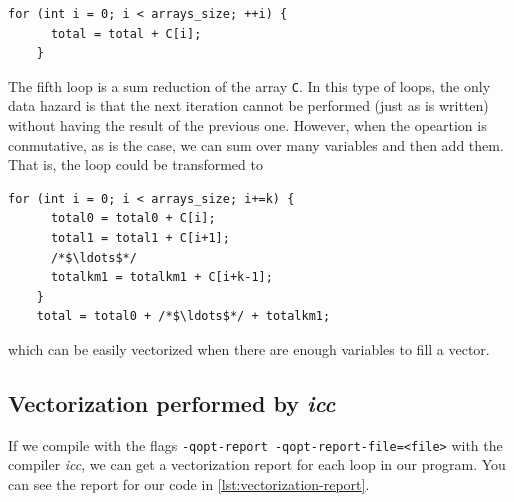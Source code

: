 \documentclass[
    12pt, %
]{fphw}
\newcommand{\tech}{\texttt}
\newcommand{\icc}{\textit{icc}}
\begin{document}
\begin{lstlisting}[gobble=4]
    for (int i = 0; i < arrays_size; ++i) {
      total = total + C[i];
    }

\end{lstlisting}

    The fifth loop is a sum reduction of the array \tech{C}.
In this type of loops, the only data hazard is that
the next iteration cannot be performed (just as is written)
without having the result of the previous one.
However, when the opeartion is conmutative, as is the case,
we can sum over many variables and then add them.
That is, the loop could be transformed to

\begin{lstlisting}[gobble=4]
    for (int i = 0; i < arrays_size; i+=k) {
      total0 = total0 + C[i];
      total1 = total1 + C[i+1];
      /*$\ldots$*/
      totalkm1 = totalkm1 + C[i+k-1];
    }
    total = total0 + /*$\ldots$*/ + totalkm1;

\end{lstlisting}

\noindent
which can be easily vectorized when there are enough variables to fill a vector.

\subsection{Vectorization performed by \icc}

    If we compile with the flags \tech{-qopt-report -qopt-report-file=<file>}
with the compiler \icc{},
we can get a vectorization report for each loop in our program.
You can see the report for our code in \cref{lst:vectorization-report}.
\end{document}

